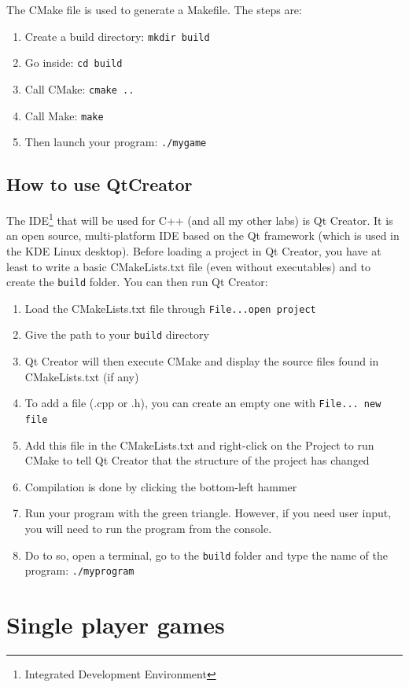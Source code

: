 \documentclass{ecnreport}
\begin{document}
The CMake file is used to generate a Makefile. The steps are:
\begin{enumerate}
 \item Create a build directory: \texttt{mkdir build}
 \item Go inside: \texttt{cd build}
 \item Call CMake: \texttt{cmake ..}
 \item Call Make: \texttt{make}
 \item Then launch your program: \texttt{./mygame}
\end{enumerate}

\subsection{How to use QtCreator}

The IDE\footnote{Integrated Development Environment} that will be used for C++ (and all my other labs) is Qt Creator. It is an open source, multi-platform IDE based on the Qt framework (which is used in the KDE Linux desktop). 
Before loading a project in Qt Creator, you have at least to write a basic CMakeLists.txt file (even without executables) and to create the \texttt{build} folder. You can then run Qt Creator:
\begin{enumerate}
\item Load the CMakeLists.txt file through \texttt{File...open project}
\item Give the path to your \texttt{build} directory
\item Qt Creator will then execute CMake and display the source files found in CMakeLists.txt (if any)
\item To add a file (.cpp or .h), you can create an empty one with \texttt{File... new file} 
\item Add this file in the CMakeLists.txt and right-click on the Project to run CMake to tell Qt Creator that the structure of the project has changed
\item Compilation is done by clicking the bottom-left hammer
\item Run your program with the green triangle. However, if you need user input, you will need to run the program from the console.
\item Do to so, open a terminal, go to the \texttt{build} folder and type the name of the program: \texttt{./myprogram}
\end{enumerate}


\section{Single player games}
\end{document}
